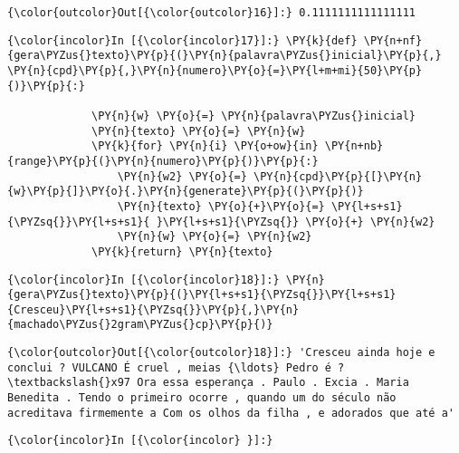             \begin{Verbatim}[commandchars=\\\{\}]
{\color{outcolor}Out[{\color{outcolor}16}]:} 0.1111111111111111
\end{Verbatim}
        
    \begin{Verbatim}[commandchars=\\\{\}]
{\color{incolor}In [{\color{incolor}17}]:} \PY{k}{def} \PY{n+nf}{gera\PYZus{}texto}\PY{p}{(}\PY{n}{palavra\PYZus{}inicial}\PY{p}{,} \PY{n}{cpd}\PY{p}{,}\PY{n}{numero}\PY{o}{=}\PY{l+m+mi}{50}\PY{p}{)}\PY{p}{:}
             
             \PY{n}{w} \PY{o}{=} \PY{n}{palavra\PYZus{}inicial}
             \PY{n}{texto} \PY{o}{=} \PY{n}{w}
             \PY{k}{for} \PY{n}{i} \PY{o+ow}{in} \PY{n+nb}{range}\PY{p}{(}\PY{n}{numero}\PY{p}{)}\PY{p}{:}
                 \PY{n}{w2} \PY{o}{=} \PY{n}{cpd}\PY{p}{[}\PY{n}{w}\PY{p}{]}\PY{o}{.}\PY{n}{generate}\PY{p}{(}\PY{p}{)}
                 \PY{n}{texto} \PY{o}{+}\PY{o}{=} \PY{l+s+s1}{\PYZsq{}}\PY{l+s+s1}{ }\PY{l+s+s1}{\PYZsq{}} \PY{o}{+} \PY{n}{w2}
                 \PY{n}{w} \PY{o}{=} \PY{n}{w2}
             \PY{k}{return} \PY{n}{texto}
\end{Verbatim}

    \begin{Verbatim}[commandchars=\\\{\}]
{\color{incolor}In [{\color{incolor}18}]:} \PY{n}{gera\PYZus{}texto}\PY{p}{(}\PY{l+s+s1}{\PYZsq{}}\PY{l+s+s1}{Cresceu}\PY{l+s+s1}{\PYZsq{}}\PY{p}{,}\PY{n}{machado\PYZus{}2gram\PYZus{}cp}\PY{p}{)}
\end{Verbatim}

            \begin{Verbatim}[commandchars=\\\{\}]
{\color{outcolor}Out[{\color{outcolor}18}]:} 'Cresceu ainda hoje e conclui ? VULCANO É cruel , meias {\ldots} Pedro é ? \textbackslash{}x97 Ora essa esperança . Paulo . Excia . Maria Benedita . Tendo o primeiro ocorre , quando um do século não acreditava firmemente a Com os olhos da filha , e adorados que até a'
\end{Verbatim}
        
    \begin{Verbatim}[commandchars=\\\{\}]
{\color{incolor}In [{\color{incolor} }]:} 
\end{Verbatim}


    
    
    
    